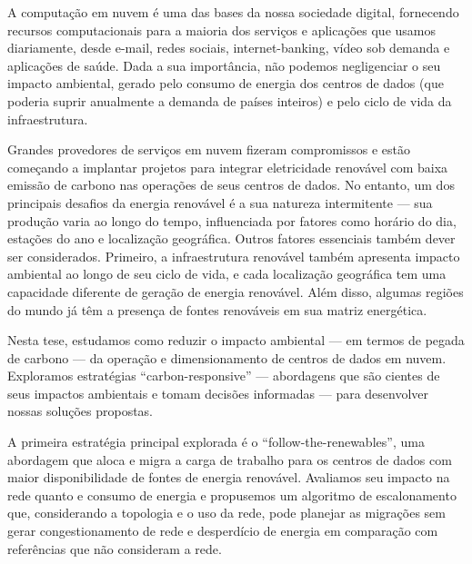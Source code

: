 A computação em nuvem é uma das bases da nossa sociedade digital, fornecendo recursos computacionais para a maioria dos serviços e aplicações que usamos diariamente, desde e-mail, redes sociais, internet-banking, vídeo sob demanda e aplicações de saúde. Dada a sua importância, não podemos negligenciar o seu impacto ambiental, gerado pelo consumo de energia dos centros de dados (que poderia suprir anualmente a demanda de países inteiros) e pelo ciclo de vida da infraestrutura.

Grandes provedores de serviços em nuvem fizeram compromissos e estão começando a implantar projetos para integrar eletricidade renovável com baixa emissão de carbono nas operações de seus centros de dados. No entanto, um dos principais desafios da energia renovável é a sua natureza intermitente --- sua produção varia ao longo do tempo, influenciada por fatores como horário do dia, estações do ano e localização geográfica. Outros fatores essenciais também dever ser considerados. Primeiro, a infraestrutura renovável também apresenta impacto ambiental ao longo de seu ciclo de vida, e cada localização geográfica tem uma capacidade diferente de geração de energia renovável. Além disso, algumas regiões do mundo já têm a presença de fontes renováveis em sua matriz energética.


Nesta tese, estudamos como reduzir o impacto ambiental --- em termos de pegada de carbono --- da operação e dimensionamento de centros de dados em nuvem. Exploramos estratégias ``carbon-responsive'' --- abordagens que são cientes de seus impactos ambientais e tomam decisões informadas --- para desenvolver nossas soluções propostas.

A primeira estratégia principal explorada é o ``follow-the-renewables'', uma abordagem que aloca e migra a carga de trabalho para os centros de dados com maior disponibilidade de fontes de energia renovável. Avaliamos seu impacto na rede quanto e consumo de energia e propusemos um algoritmo de escalonamento que, considerando a topologia  e o uso da rede, pode planejar as migrações sem gerar congestionamento de rede e desperdício de energia em comparação com referências que não consideram a rede.

